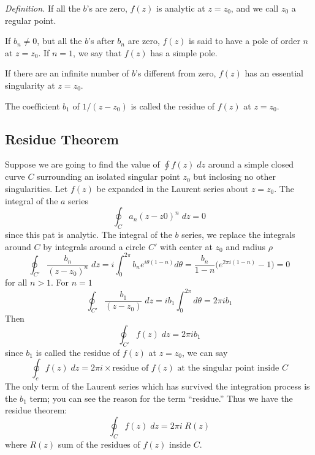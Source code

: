 \documentclass[../../../main.tex]{subfiles}
\begin{document}
\emph{Definition.} If all the $b$’s are zero, $f (z)$ is analytic at $z = z_0$, and we call $z_0$ a regular point.

If $b_n \neq 0$, but all the $b$’s after $b_n$ are zero, $f (z)$ is said to have a pole of order $n$ at $z = z_0$. If $n = 1$, we say that $f (z)$ has a simple pole.

If there are an infinite number of $b$’s different from zero, $f (z)$ has an essential singularity at $z = z_0$.

The coefficient $b_1$ of $1/(z - z_0)$ is called the residue of $f (z)$ at $z = z_0$.

\subsection{Residue Theorem}
Suppose we are going to find the value of $\oint  f (z) \;dz$ around a simple closed curve $C$ surrounding an isolated singular point $z_0$ but inclosing no other singularities. Let $f (z)$ be expanded in the Laurent series about $z = z_0$. The integral of the $a$ series
\begin{equation*}
    \oint_C a_n(z-z0)^n\;dz=0
\end{equation*}
since this pat is analytic. The integral of the $b$ series, we replace the integrals around $C$ by integrals around a circle $C'$ with center at $z_0$ and radius $\rho$
\begin{equation*}
    \oint_{C'} \frac{b_n}{(z-z_0)^n}\;dz=i\int_{0}^{2\pi}b_ne^{i\theta(1-n)}d\theta=\frac{b_n}{1-n}\biggl(e^{2\pi i (1-n)}-1\biggr)=0
\end{equation*}
for all $n>1$. For $n=1$
\begin{equation*}
    \oint_{C'} \frac{b_1}{(z-z_0)}\;dz=ib_1\int_{0}^{2\pi}d\theta=2\pi i b_1
\end{equation*}
Then
\begin{equation*}
    \oint_{C'}  f (z) \;dz=2\pi i b_1
\end{equation*}
since $b_1$ is called the residue of $f (z)$ at $z = z_0$, we can say
\begin{equation*}
    \oint_c  f (z) \;dz=2\pi i \times \text{residue of $f (z)$ at the singular point inside $C$}
\end{equation*}
The only term of the Laurent series which has survived the integration process is the $b_1$ term; you can see the reason for the term “residue.” Thus we have the residue theorem:
\begin{equation*}
    \oint_C  f (z) \;dz=2\pi i\; R(z)
\end{equation*}
where $R(z)$ sum of the residues of $f (z)$ inside $C$.
\end{document}
